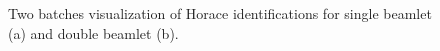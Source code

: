 \begin{figure}
    \centering
    \caption{Two batches visualization of Horace identifications for single beamlet (a) and double beamlet (b). }
    \label{fig:horace_spots}
\end{figure}